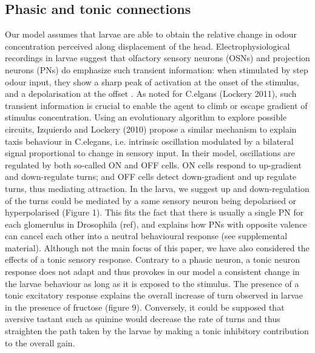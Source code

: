\documentclass[10pt,a4paper]{article}
\begin{document}
\subsection{Phasic and tonic connections}
Our model assumes that larvae are able to obtain the relative change in odour concentration perceived along displacement of the head.  Electrophysiological recordings in larvae suggest that olfactory sensory neurons (OSNs) and projection neurons (PNs) do emphasize such transient information: when stimulated by step odour input, they show a sharp peak of activation at the onset of the stimulus, and a depolarisation at the offset \cite{schulze2015dynamical}. As noted for C.elgans (Lockery 2011), such transient information is crucial to enable the agent to climb or escape gradient of stimulus concentration. Using an evolutionary algorithm to explore possible circuits, Izquierdo and Lockery (2010) propose a similar mechanism to explain taxis behaviour in C.elegans, i.e. intrinsic oscillation modulated by a bilateral signal proportional to change in sensory input. In their model, oscillations are regulated by both so-called ON and OFF cells. ON cells respond to up-gradient and down-regulate turns; and OFF cells detect down-gradient and up regulate turns, thus mediating attraction. In the larva, we suggest up and down-regulation of the turns could be mediated by a same sensory neuron being depolarised or hyperpolarised (Figure 1). This fits the fact that there is usually a single PN for each glomerulus in Drosophila (ref), and explains how PNs with opposite valence can cancel each other into a neutral behavioural response (see supplemental material). 
Although not the main focus of this paper, we have also considered the effects of a tonic sensory response. Contrary to a phasic neuron, a tonic neuron response does not adapt and thus provokes in our model a consistent change in the larvae behaviour as long as it is exposed to the stimulus. The presence of a tonic excitatory response explains the overall increase of turn observed in larvae in the presence of fructose (figure 9). Conversely, it could be supposed that aversive tastant such as quinine would decrease the rate of turns and thus straighten the path taken by the larvae by making a tonic inhibitory contribution to the overall gain. 
\end{document}
